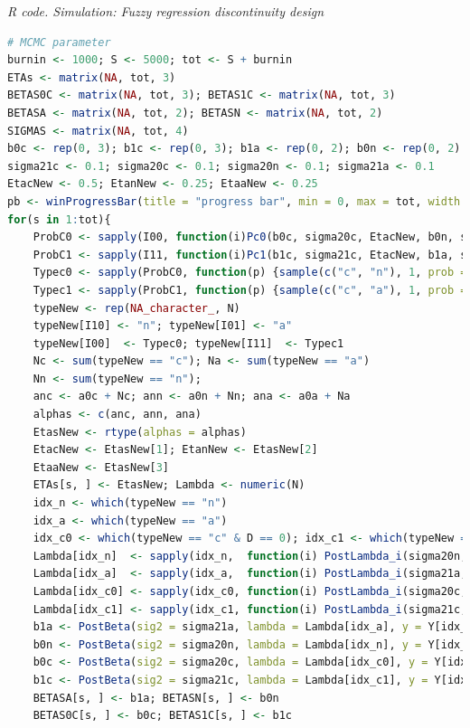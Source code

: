 \begin{tcolorbox}[enhanced,width=4.67in,center upper,
	fontupper=\large\bfseries,drop shadow southwest,sharp corners]
	\textit{R code. Simulation: Fuzzy regression discontinuity design}
	\begin{VF}
		\begin{lstlisting}[language=R]	
# MCMC parameter
burnin <- 1000; S <- 5000; tot <- S + burnin 
ETAs <- matrix(NA, tot, 3)
BETAS0C <- matrix(NA, tot, 3); BETAS1C <- matrix(NA, tot, 3)
BETASA <- matrix(NA, tot, 2); BETASN <- matrix(NA, tot, 2)
SIGMAS <- matrix(NA, tot, 4)
b0c <- rep(0, 3); b1c <- rep(0, 3); b1a <- rep(0, 2); b0n <- rep(0, 2)
sigma21c <- 0.1; sigma20c <- 0.1; sigma20n <- 0.1; sigma21a <- 0.1
EtacNew <- 0.5; EtanNew <- 0.25; EtaaNew <- 0.25
pb <- winProgressBar(title = "progress bar", min = 0, max = tot, width = 300)
for(s in 1:tot){
	ProbC0 <- sapply(I00, function(i)Pc0(b0c, sigma20c, EtacNew, b0n, sigma20n, EtanNew, i = i))
	ProbC1 <- sapply(I11, function(i)Pc1(b1c, sigma21c, EtacNew, b1a, sigma21a, EtaaNew, i = i))
	Typec0 <- sapply(ProbC0, function(p) {sample(c("c", "n"), 1, prob = c(p, 1-p))})
	Typec1 <- sapply(ProbC1, function(p) {sample(c("c", "a"), 1, prob = c(p, 1-p))})
	typeNew <- rep(NA_character_, N)
	typeNew[I10] <- "n"; typeNew[I01] <- "a"
	typeNew[I00]  <- Typec0; typeNew[I11]  <- Typec1
	Nc <- sum(typeNew == "c"); Na <- sum(typeNew == "a")
	Nn <- sum(typeNew == "n");
	anc <- a0c + Nc; ann <- a0n + Nn; ana <- a0a + Na
	alphas <- c(anc, ann, ana)
	EtasNew <- rtype(alphas = alphas)
	EtacNew <- EtasNew[1]; EtanNew <- EtasNew[2]
	EtaaNew <- EtasNew[3]
	ETAs[s, ] <- EtasNew; Lambda <- numeric(N)
	idx_n <- which(typeNew == "n")
	idx_a <- which(typeNew == "a")
	idx_c0 <- which(typeNew == "c" & D == 0); idx_c1 <- which(typeNew == "c" & D == 1)
	Lambda[idx_n]  <- sapply(idx_n,  function(i) PostLambda_i(sigma20n, b0n, Y[i],  W[i, ], v))
	Lambda[idx_a]  <- sapply(idx_a,  function(i) PostLambda_i(sigma21a, b1a, Y[i],  W[i, ], v))
	Lambda[idx_c0] <- sapply(idx_c0, function(i) PostLambda_i(sigma20c, b0c, Y[i], Wc[i, ], v))
	Lambda[idx_c1] <- sapply(idx_c1, function(i) PostLambda_i(sigma21c, b1c, Y[i], Wc[i, ], v))
	b1a <- PostBeta(sig2 = sigma21a, lambda = Lambda[idx_a], y = Y[idx_a], H = W[idx_a,])
	b0n <- PostBeta(sig2 = sigma20n, lambda = Lambda[idx_n], y = Y[idx_n], H = W[idx_n,])
	b0c <- PostBeta(sig2 = sigma20c, lambda = Lambda[idx_c0], y = Y[idx_c0], H = Wc[idx_c0,])
	b1c <- PostBeta(sig2 = sigma21c, lambda = Lambda[idx_c1], y = Y[idx_c1], H = Wc[idx_c1,])
	BETASA[s, ] <- b1a; BETASN[s, ] <- b0n
	BETAS0C[s, ] <- b0c; BETAS1C[s, ] <- b1c 
\end{lstlisting}
	\end{VF}
\end{tcolorbox}  

